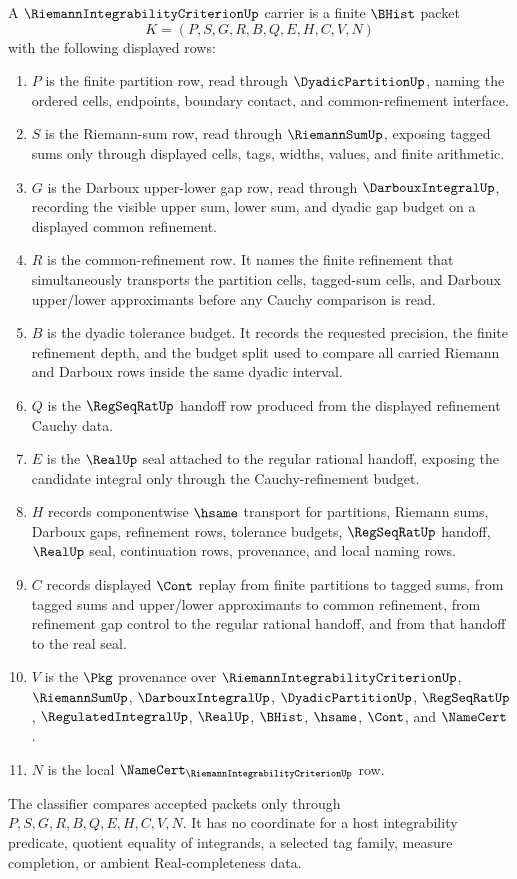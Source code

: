 \begin{definition}
\label{def:riemann-integrability-criterion-carrier}
A $\RiemannIntegrabilityCriterionUp$ carrier is a finite $\BHist$ packet
$$
K=(P,S,G,R,B,Q,E,H,C,V,N)
$$
with the following displayed rows:
\begin{enumerate}
\item $P$ is the finite partition row, read through $\DyadicPartitionUp$, naming the ordered cells, endpoints, boundary contact, and common-refinement interface.
\item $S$ is the Riemann-sum row, read through $\RiemannSumUp$, exposing tagged sums only through displayed cells, tags, widths, values, and finite arithmetic.
\item $G$ is the Darboux upper-lower gap row, read through $\DarbouxIntegralUp$, recording the visible upper sum, lower sum, and dyadic gap budget on a displayed common refinement.
\item $R$ is the common-refinement row. It names the finite refinement that simultaneously transports the partition cells, tagged-sum cells, and Darboux upper/lower approximants before any Cauchy comparison is read.
\item $B$ is the dyadic tolerance budget. It records the requested precision, the finite refinement depth, and the budget split used to compare all carried Riemann and Darboux rows inside the same dyadic interval.
\item $Q$ is the $\RegSeqRatUp$ handoff row produced from the displayed refinement Cauchy data.
\item $E$ is the $\RealUp$ seal attached to the regular rational handoff, exposing the candidate integral only through the Cauchy-refinement budget.
\item $H$ records componentwise $\hsame$ transport for partitions, Riemann sums, Darboux gaps, refinement rows, tolerance budgets, $\RegSeqRatUp$ handoff, $\RealUp$ seal, continuation rows, provenance, and local naming rows.
\item $C$ records displayed $\Cont$ replay from finite partitions to tagged sums, from tagged sums and upper/lower approximants to common refinement, from refinement gap control to the regular rational handoff, and from that handoff to the real seal.
\item $V$ is the $\Pkg$ provenance over $\RiemannIntegrabilityCriterionUp$, $\RiemannSumUp$, $\DarbouxIntegralUp$, $\DyadicPartitionUp$, $\RegSeqRatUp$, $\RegulatedIntegralUp$, $\RealUp$, $\BHist$, $\hsame$, $\Cont$, and $\NameCert$.
\item $N$ is the local $\NameCert_{\RiemannIntegrabilityCriterionUp}$ row.
\end{enumerate}
The classifier compares accepted packets only through $P,S,G,R,B,Q,E,H,C,V,N$. It has no coordinate for a host integrability predicate, quotient equality of integrands, a selected tag family, measure completion, or ambient Real-completeness data.
\end{definition}

